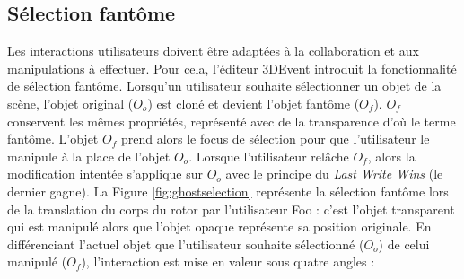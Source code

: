 \subsection{Sélection fantôme}
Les interactions utilisateurs doivent être adaptées à la collaboration et aux 
manipulations à effectuer. Pour cela, l'éditeur 3DEvent introduit la fonctionnalité de 
sélection \og fantôme\fg{}. Lorsqu'un utilisateur souhaite sélectionner un objet de 
la scène, l'objet original ($O_o$) est 
cloné et devient l'objet fantôme ($O_f$). $O_f$ conservent les mêmes propriétés, 
représenté avec de la 
transparence d'où le terme \og fantôme\fg{}. 
L'objet $O_f$ prend alors le focus de sélection pour que l'utilisateur le manipule à 
la place de l'objet $O_o$. 
Lorsque l'utilisateur relâche $O_f$, alors la modification intentée s'applique sur 
$O_o$ avec le principe du \textit{Last Write Wins} (le dernier gagne).
La Figure \ref{fig:ghostselection} 
représente la sélection fantôme lors de la translation du corps du rotor par 
l'utilisateur Foo : c'est l'objet transparent qui est manipulé alors que l'objet opaque 
représente sa position originale. 
En différenciant l'actuel objet que l'utilisateur souhaite sélectionné ($O_{o}$) de 
celui manipulé ($O_f$), l'interaction est mise en valeur sous quatre angles :
